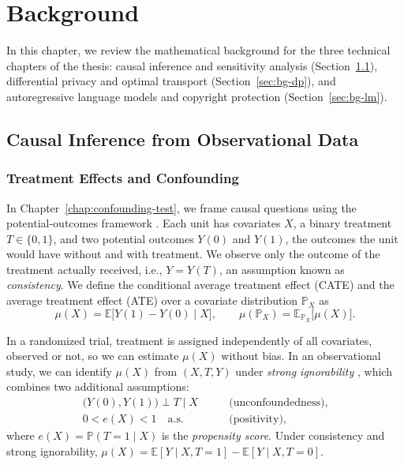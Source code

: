 \chapter{Background}
\label{chap:background}

In this chapter, we review the mathematical background for the three technical chapters of the thesis: causal inference and sensitivity analysis (Section~\ref{sec:bg-causal}), differential privacy and optimal transport (Section~\ref{sec:bg-dp}), and autoregressive language models and copyright protection (Section~\ref{sec:bg-lm}).

\section{Causal Inference from Observational Data}
\label{sec:bg-causal}

\subsection{Treatment Effects and Confounding}

In Chapter~\ref{chap:confounding-test}, we frame causal questions using the potential-outcomes framework \citep{neyman1923application,rubin1978bayesian}. Each unit has covariates \(X\), a binary treatment \(T \in \{0, 1\}\), and two potential outcomes \(Y(0)\) and \(Y(1)\), the outcomes the unit would have without and with treatment. We observe only the outcome of the treatment actually received, i.e., \(Y = Y(T)\), an assumption known as \emph{consistency}. We define the conditional average treatment effect (CATE) and the average treatment effect (ATE) over a covariate distribution \(\mathbb{P}_X\) as
\[
  \mu(X) = \mathbb{E}\bigl[Y(1) - Y(0) \mid X\bigr],
  \qquad
  \mu(\mathbb{P}_X) = \mathbb{E}_{\mathbb{P}_X}\bigl[\mu(X)\bigr].
\]

In a randomized trial, treatment is assigned independently of all covariates, observed or not, so we can estimate \(\mu(X)\) without bias. In an observational study, we can identify \(\mu(X)\) from \((X, T, Y)\) under \emph{strong ignorability} \citep{rosenbaum1983central}, which combines two additional assumptions:
\begin{align*}
  \bigl(Y(0), Y(1)\bigr) \perp T \mid X
  &\qquad\text{(unconfoundedness)}, \\
  0 < e(X) < 1 \quad\text{a.s.}
  &\qquad\text{(positivity)},
\end{align*}
where \(e(X) = \mathbb{P}(T = 1 \mid X)\) is the \emph{propensity score}. Under consistency and strong ignorability, \(\mu(X) = \mathbb{E}[Y \mid X, T = 1] - \mathbb{E}[Y \mid X, T = 0]\).

